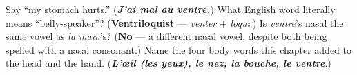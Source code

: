 \begin{tcolorbox}[breakable,colback=teal!4,colframe=teal!35!black,title={Before you move on}]
Say \textquotedblleft{}my stomach hurts.\textquotedblright{} (\emph{\textbf{J'ai mal au ventre.}}) What English word literally means \textquotedblleft{}belly-speaker\textquotedblright{}? (\textbf{Ventriloquist} — \emph{venter} + \emph{loquī}.) Is \emph{ventre}'s nasal the same vowel as \emph{la main}'s? (\textbf{No} — a different nasal vowel, despite both being spelled with a nasal consonant.) Name the four body words this chapter added to the head and the hand. (\emph{\textbf{L'œil\emph{ (les yeux), }le nez\emph{, }la bouche\emph{, }le ventre}}.)
\end{tcolorbox}
